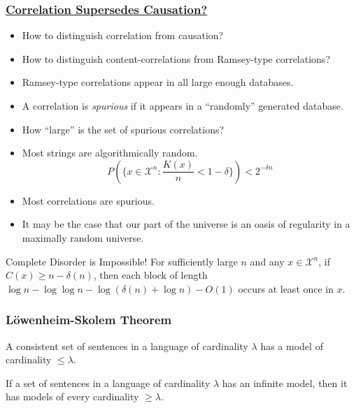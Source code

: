 \documentclass[UTF8,11pt,colorlinks,compress,openany]{beamer}%
\begin{document}
\begin{frame}\frametitle{\href{https://www.cs.auckland.ac.nz/~cristian/crispapers/fos2016.pdf}{Correlation Supersedes Causation?}}\vspace{-1ex}
	\begin{itemize}
		\item How to distinguish correlation from causation?
		\item How to distinguish content-correlations from Ramsey-type correlations?
		\item Ramsey-type correlations appear in all
		large enough databases.
		\item A correlation is \emph{spurious} if it appears in a ``randomly'' generated database.
		\item How ``large'' is the set of spurious correlations?
		\item Most strings are algorithmically random. 
		\[P\left(\Big\{x\in\mathcal{X}^n: \frac{K(x)}{n}<1-\delta\Big\}\right)<2^{-\delta n}\]
		\item Most correlations are spurious.
		\item It may be the case that our part of the universe is an oasis of regularity in a maximally random universe.
	\end{itemize}\vspace{-1ex}
	\begin{block}{Complete Disorder is Impossible!}
		For sufficiently large $n$ and any $x\in\mathcal{X}^n$, if $C(x)\geq n-\delta(n)$, then each block of length $\log n-\log\log n-\log(\delta(n)+\log n)-O(1)$ occurs at least once in $x$.
	\end{block}
\end{frame}

\begin{frame}\frametitle{L\"owenheim-Skolem Theorem}
	\begin{theorem}
		A consistent set of sentences in a language of cardinality $\lambda$ has a model of cardinality $\leq\lambda$.
	\end{theorem}
	\begin{theorem}
		If a set of sentences in a language of cardinality $\lambda$ has an infinite model, then it has models of every cardinality $\geq\lambda$.
	\end{theorem}
\end{frame}
\end{document}
